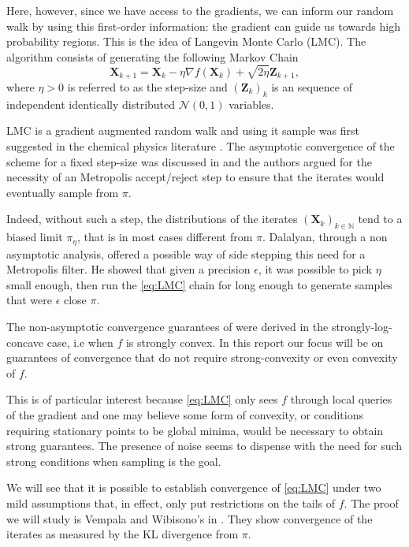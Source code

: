 \documentclass[10pt,journal,a4paper]{IEEEtran}
\theoremstyle{definition}
\newcommand{\bX}{\mathbf{X}}
\begin{document}
Here, however, since we have access to the gradients, we can inform our random walk by using this first-order information: the gradient can guide us towards high probability regions. This is the idea of Langevin Monte Carlo (LMC). The algorithm consists of generating the following Markov Chain 
\begin{equation}
\bX_{k+1} = \bX_k - \eta \nabla f(\bX_k) + \sqrt{2\eta}\mathbf{Z}_{k+1},
\label{eq:LMC}
\tag{LMC}
\end{equation}
where $\eta > 0$ is referred to as the step-size and $(\mathbf{Z}_k)_k$ is an sequence of independent identically distributed $\mathcal{N}(0, 1)$ variables.

LMC is a gradient augmented random walk and using it sample was first suggested in the chemical physics literature \cite{rossky_brownian_1978}. The asymptotic convergence of the scheme for a fixed step-size was discussed in \cite{roberts_exponential_1996} and the authors argued for the necessity of an Metropolis accept/reject step to ensure that the iterates would eventually sample from $\pi$.

Indeed, without such a step, the distributions of the iterates $(\bX_k)_{k\in \mathbb{N}}$ tend to a biased limit $\pi_\eta$, that is in most cases different from $\pi$. Dalalyan, through a non asymptotic analysis, offered a possible way of side stepping this need for a Metropolis filter. He showed that given a precision $\epsilon$, it was possible to pick $\eta$ small enough, then run the \eqref{eq:LMC} chain for long enough to generate samples that were $\epsilon$ close $\pi$.

The non-asymptotic convergence guarantees of \cite{dalalyan_theoretical_2016} were derived in the strongly-log-concave case, i.e when $f$ is strongly convex. In this report our focus will be on guarantees of convergence that do not require strong-convexity or even convexity of $f$. 

This is of particular interest because \eqref{eq:LMC} only sees $f$ through local queries of the gradient and one may believe some form of convexity, or conditions requiring stationary points to be global minima, would be necessary to obtain strong guarantees. The presence of noise seems to dispense with the need for such strong conditions when sampling is the goal.

We will see that it is possible to establish convergence of \eqref{eq:LMC} under two mild assumptions that, in effect, only put restrictions on the tails of $f$. The proof we will study is Vempala and Wibisono's in \cite{vempala_rapid_2019}. They show convergence of the iterates as measured by the KL divergence from $\pi$.
\end{document}
